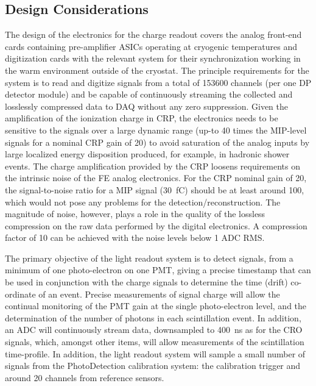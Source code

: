 \subsection{Design Considerations}
\label{sec:fddp-tpc-elec-des-consid}

The design of the electronics for the charge readout covers the analog front-end cards containing pre-amplifier ASICs operating at cryogenic temperatures and digitization cards with the relevant system for their synchronization working in the warm environment outside of the cryostat. The principle requirements for the system is to read and digitize signals from a total of \num{153600} channels (per one DP detector module) and be capable of continuously streaming the collected and losslessly compressed data to DAQ without any zero suppression. Given the amplification of the ionization charge in CRP, the electronics needs to be sensitive to the signals over a large dynamic range (up-to \num{40} times the MIP-level signals for a nominal CRP gain of \num{20}) to avoid saturation of the analog inputs by large localized energy disposition produced, for example, in hadronic shower events. The charge amplification provided by the CRP loosens requirements on the intrinsic noise of the FE analog electronics. For the CRP nominal gain of \num{20}, the signal-to-noise ratio for a MIP signal (\SI{30}{fC}) should be at least around \num{100}, which would not pose any problems for the detection/reconstruction. The magnitude of noise, however, plays a role in the quality of the lossless compression on the raw data performed by the digital electronics. A compression factor of \num{10} can be achieved with the noise levels below \num{1} ADC RMS.  %

The primary objective of the light readout system is to detect signals, from a minimum of one photo-electron on one PMT, giving a precise timestamp that can be used in conjunction with the charge signals to determine the time (drift) co-ordinate of an event.  Precise measurements of signal charge will allow the continual monitoring of the PMT gain at the single photo-electron level, and the determination of the number of photons in each scintillation event.  In addition, an ADC will continuously stream data, downsampled to \SI{400}{ns} as for the CRO signals,  which, amongst other items, will allow measurements of the scintillation time-profile. In addition, the light readout system will sample a small number of signals from the PhotoDetection calibration system: the calibration trigger and around \num{20} channels from reference sensors.

